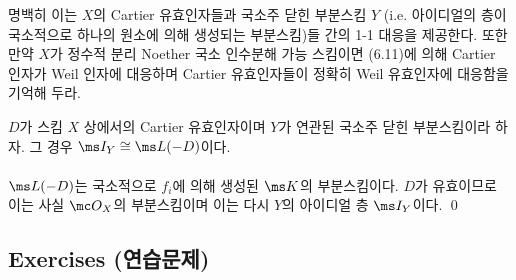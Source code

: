 	
	\begin{remark}
	명백히 이는 $X$의 Cartier 유효인자들과 국소주 닫힌 부분스킴 $Y$%
	(i.e. 아이디얼의 층이 국소적으로 하나의 원소에 의해 생성되는 부분스킴)들 간의 1-1 대응을 제공한다.
	또한 만약 $X$가 정수적 분리 Noether 국소 인수분해 가능 스킴이면 (6.11)에 의해 Cartier 인자가 Weil 인자에 대응하며
	Cartier 유효인자들이 정확히 Weil 유효인자에 대응함을 기억해 두라.
	\end{remark}
	
	
	\begin{proposition}
	$D$가 스킴 $X$ 상에서의 Cartier 유효인자이며 $Y$가 연관된 국소주 닫힌 부분스킴이라 하자.
	그 경우 $\ms I_Y\cong\ms L(-D)$이다.\\\\
	\pf $\ms L(-D)$는 국소적으로 $f_i$에 의해 생성된 $\ms K$의 부분스킴이다.
	$D$가 유효이므로 이는 사실 $\mc O_X$의 부분스킴이며 이는 다시 $Y$의 아이디얼 층 $\ms I_Y$이다.
	\qed
	\end{proposition}
	
	
	
	\subsection*{Exercises (연습문제)}
	
